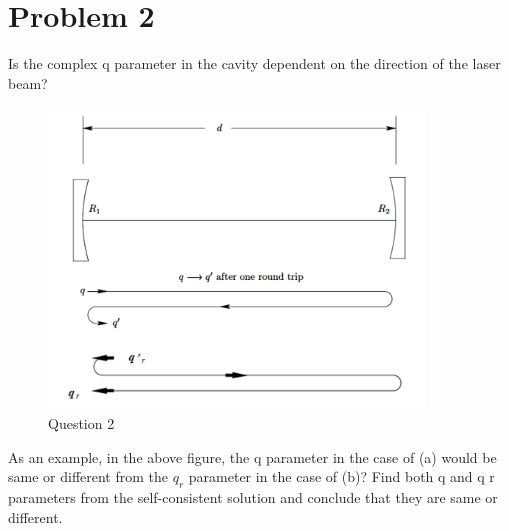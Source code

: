 \documentclass{article}
\begin{document}
\section{Problem 2}
Is the complex q parameter in the cavity dependent on the direction of the laser beam?
\begin{figure}
	\centering
	\includegraphics[width=10cm]{q22.png}
	\caption{Question 2}
\end{figure}
As an example, in the above figure, the q parameter in the case of (a) would be same or different from the $q_r$ parameter in the case of (b)? Find both q and q r parameters from the self-consistent solution and conclude that they are same or different.
\end{document}
